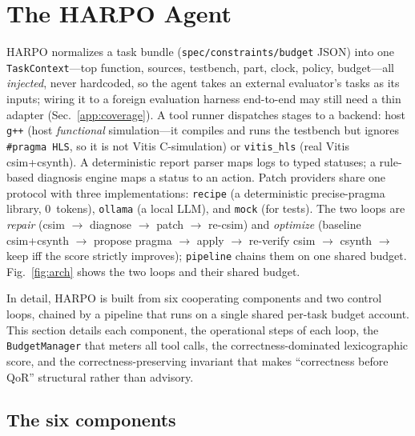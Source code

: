 \section{The HARPO Agent}\label{app:arch}

HARPO normalizes a task bundle (\texttt{spec/constraints/budget} JSON)
into one \texttt{TaskContext}---top function, sources, testbench, part,
clock, policy, budget---all \emph{injected}, never hardcoded, so the
agent takes an external evaluator's tasks as its inputs; wiring it to a
foreign evaluation harness end-to-end may still need a thin adapter
(Sec.~\ref{app:coverage}). A tool runner
dispatches stages to a backend: host \texttt{g++} (host \emph{functional}
simulation---it compiles and runs the testbench but ignores
\texttt{\#pragma HLS}, so it is not Vitis C-simulation) or
\texttt{vitis\_hls} (real Vitis csim+csynth). A deterministic report parser maps logs to typed statuses; a
rule-based diagnosis engine maps a status to an action. Patch providers
share one protocol with three implementations: \texttt{recipe} (a
deterministic precise-pragma library, 0~tokens), \texttt{ollama} (a local
LLM), and \texttt{mock} (for tests). The two loops are \emph{repair} (csim
$\rightarrow$ diagnose $\rightarrow$ patch $\rightarrow$ re-csim) and
\emph{optimize} (baseline csim+csynth $\rightarrow$ propose pragma
$\rightarrow$ apply $\rightarrow$ re-verify csim $\rightarrow$ csynth
$\rightarrow$ keep iff the score strictly improves); \texttt{pipeline}
chains them on one shared budget. Fig.~\ref{fig:arch} shows the two loops and their shared budget.



In detail, HARPO is built from six cooperating components and two
control loops, chained by a pipeline that runs on a single shared per-task
budget account. This section details each component, the operational
steps of each loop, the \texttt{BudgetManager} that meters all tool
calls, the correctness-dominated lexicographic score, and the
correctness-preserving invariant that makes ``correctness before QoR''
structural rather than advisory.

\subsection{The six components}\label{app:arch:components}

